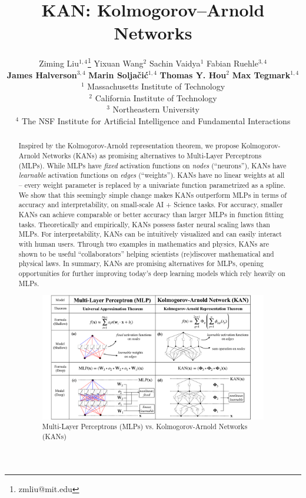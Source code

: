 \documentclass{article}
\title{KAN: Kolmogorov–Arnold Networks}
\author{%
Ziming Liu$^{1,4}$\thanks{zmliu@mit.edu} \quad Yixuan Wang$^{2}$ \quad Sachin Vaidya$^{1}$ \quad Fabian Ruehle$^{3,4}$ \\ \quad \textbf{James Halverson}$^{3,4}$ \quad 
\textbf{Marin Solja\v ci\'c}$^{1,4}$ \quad \textbf{Thomas Y.  Hou}$^2$ \quad \textbf{Max Tegmark}$^{1,4}$ \\
$^1$ Massachusetts Institute of Technology\\ $^2$ California Institute of Technology\\ $^3$ Northeastern University\\ $^4$ The NSF Institute for Artificial Intelligence and Fundamental Interactions
}
\numberwithin{equation}{section}
\numberwithin{figure}{section}
\begin{document}
\maketitle

\begin{abstract}\small
Inspired by the Kolmogorov-Arnold representation theorem, we propose Kolmogorov-Arnold Networks (KANs) as promising alternatives to Multi-Layer Perceptrons (MLPs). While MLPs have \textit{fixed} activation functions on \textit{nodes} (``neurons''), KANs have \textit{learnable} activation functions on \textit{edges} (``weights''). KANs have no linear weights at all -- every weight parameter is replaced by a univariate function parametrized as a spline. We show that this seemingly simple change makes KANs outperform MLPs in terms of accuracy and interpretability, on small-scale AI + Science tasks. For accuracy, smaller KANs can achieve comparable or better accuracy than larger MLPs in function fitting tasks. Theoretically and empirically, KANs possess faster neural scaling laws than MLPs. For interpretability, KANs can be intuitively visualized and can easily interact with human users. Through two examples in mathematics and physics, KANs are shown to be useful ``collaborators'' helping scientists (re)discover mathematical and physical laws. %
In summary, KANs are promising alternatives for MLPs, opening opportunities for further improving today's deep learning models which rely heavily on MLPs.


\begin{figure}[hb]
    \centering
    \includegraphics[width=0.9\linewidth]{./figs/kan_mlp.pdf}
    \caption{Multi-Layer Perceptrons (MLPs) vs. Kolmogorov-Arnold Networks (KANs)}
    \label{fig:kan_mlp}
\end{figure}


\end{abstract}
\end{document}
